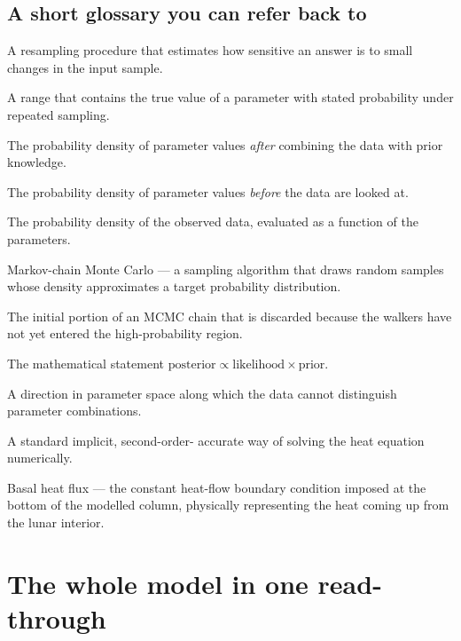 \documentclass[11pt]{report}
\begin{document}
\section{A short glossary you can refer back to}

\begin{description}\itemsep1pt
  \item[Bootstrap] A resampling procedure that estimates how
        sensitive an answer is to small changes in the input
        sample.
  \item[Confidence interval (CI)] A range that contains the true
        value of a parameter with stated probability under repeated
        sampling.
  \item[Posterior] The probability density of parameter values
        \emph{after} combining the data with prior knowledge.
  \item[Prior] The probability density of parameter values
        \emph{before} the data are looked at.
  \item[Likelihood] The probability density of the observed data,
        evaluated as a function of the parameters.
  \item[MCMC] Markov-chain Monte Carlo --- a sampling algorithm
        that draws random samples whose density approximates a
        target probability distribution.
  \item[Burn-in] The initial portion of an MCMC chain that is
        discarded because the walkers have not yet entered the
        high-probability region.
  \item[Bayes' theorem] The mathematical statement
        $\mathrm{posterior} \propto \mathrm{likelihood} \times
        \mathrm{prior}$.
  \item[Degeneracy] A direction in parameter space along which the
        data cannot distinguish parameter combinations.
  \item[Crank--Nicolson scheme] A standard implicit, second-order-
        accurate way of solving the heat equation numerically.
  \item[$Q_b$] Basal heat flux --- the constant heat-flow boundary
        condition imposed at the bottom of the modelled column,
        physically representing the heat coming up from the lunar
        interior.
\end{description}

\chapter{The whole model in one read-through}\label{ch:walkthrough}
\end{document}
